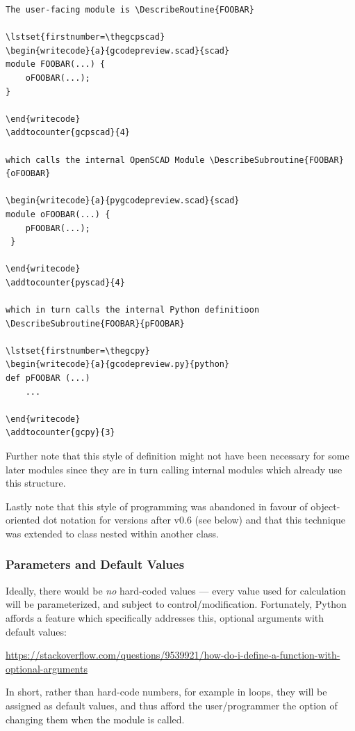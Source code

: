 \documentclass{ltxdoc}
\begin{document}
\begin{verbatim}
The user-facing module is \DescribeRoutine{FOOBAR}

\lstset{firstnumber=\thegcpscad}
\begin{writecode}{a}{gcodepreview.scad}{scad}
module FOOBAR(...) {
    oFOOBAR(...);
}

\end{writecode}
\addtocounter{gcpscad}{4}
 
which calls the internal OpenSCAD Module \DescribeSubroutine{FOOBAR}{oFOOBAR}

\begin{writecode}{a}{pygcodepreview.scad}{scad}
module oFOOBAR(...) {
    pFOOBAR(...);
 }
 
\end{writecode}
\addtocounter{pyscad}{4}

which in turn calls the internal Python definitioon \DescribeSubroutine{FOOBAR}{pFOOBAR}

\lstset{firstnumber=\thegcpy}
\begin{writecode}{a}{gcodepreview.py}{python}
def pFOOBAR (...)
    ...
    
\end{writecode}
\addtocounter{gcpy}{3}
\end{verbatim}

Further note that this style of definition might not have been necessary for some later modules since they are in turn calling internal modules which already use this structure.

Lastly note that this style of programming was abandoned in favour of object-oriented dot notation for versions after v0.6 (see below) and that this technique was extended to class nested within another class.

\subsubsection{Parameters and Default Values}

Ideally, there would be \emph{no} hard-coded values --- every value used for calculation will be parameterized, and subject to control/modification. Fortunately, Python affords a feature which specifically addresses this, optional arguments with default values:

\noindent\url{https://stackoverflow.com/questions/9539921/how-do-i-define-a-function-with-optional-arguments}

In short, rather than hard-code numbers, for example in loops, they will be assigned as default values, and thus afford the user/programmer the option of changing them when the module is called. 
\end{document}
